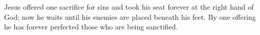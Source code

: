 \lettrine[lines=3]{J}{}esus offered one sacrifice for sins and took his seat forever at the right hand of God; now he waits until his enemies are placed beneath his feet. By one offering he has forever perfected those who are being sanctified.